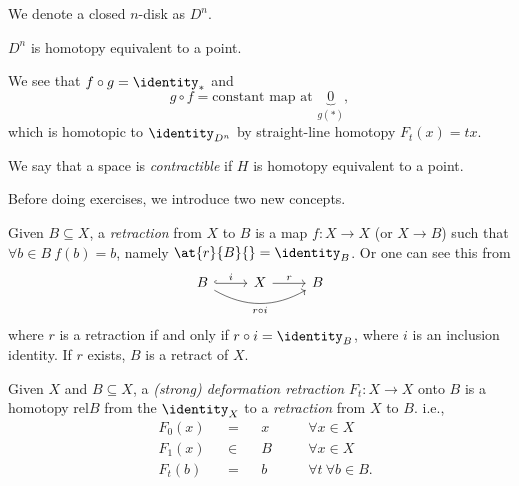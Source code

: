 \begin{notation}
	We denote a closed \(n\)-disk as \(D^n\).
\end{notation}
\begin{eg}
	\(D^n\) is homotopy equivalent to a point.
	\begin{figure}[H]
		\centering
		\label{fig:eg:closed-disk-eq-point}
	\end{figure}

	We see that \(f\circ g = \identity_*\) and
	\[
		g\circ f = \text{constant map at }\underbrace{0}_{g(*)},
	\]
	which is homotopic to \(\identity_{D^n}\) by straight-line homotopy \(F_t(x) = tx\).
\end{eg}

\begin{note}
	We say that a space is \emph{contractible} if \(H\) is homotopy equivalent to a point.
\end{note}

Before doing exercises, we introduce two new concepts.
\begin{definition}[Retraction]\label{def:retraction}
	Given \(B\subseteq X\), a \emph{retraction} from \(X\) to \(B\) is a map \(f\colon X\to X\) (or \(X\to B\))
	such that \(\forall b\in B\ f(b) = b\), namely \(\at{r}{B}{} = \identity_B\). Or one can see this from
	\[
		\begin{tikzcd}
			B \ar[rr, swap, bend right=30, "r \circ i"] \ar[r,hook,"i"] & X \ar[r, "r"] & B
		\end{tikzcd}
	\]
	where \(r\) is a retraction if and only if \(r\circ i = \identity_B\), where \(i\) is an inclusion identity.
	If \(r\) exists, \(B\) is a retract of \(X\).
\end{definition}
\begin{definition}\label{def:deformation-retraction}
	Given \(X\) and \(B\subseteq X\), a \emph{(strong) deformation retraction} \(F_t\colon X\to X\) onto \(B\) is
	a homotopy \(\mathrm{rel} B\) from the \(\identity_X\) to a \emph{retraction} from \(X\) to \(B\). i.e.,
	\[
		\begin{alignedat}{4}
			&F_0(x) &&= &&x\quad &&\forall x\in X\\
			&F_1(x) &&\in &&B\quad &&\forall x\in X\\
			&F_t(b) &&= &&b\quad &&\forall t\ \forall b\in B.
		\end{alignedat}
	\]
\end{definition}

